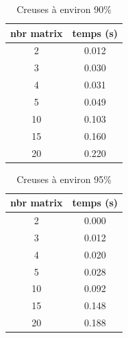 \documentclass[a4paper]{scrartcl}
\begin{document}
\begin{table}[H]
    \caption{Creuses à environ 90\%}
    \label{tab:10}
    \begin{center}
        \begin{tabular}{cc}
             nbr matrix & temps (s)\\
            \hline
            2 &        0.012 \\

    3 &        0.030 \\

    4 &        0.031 \\

    5 &        0.049 \\

    10 &        0.103\\

    15 &        0.160 \\

    20 &        0.220 \\

        \end{tabular}
    \end{center}
\end{table}
\begin{table}[H]
    \caption{Creuses à environ 95\%}
    \label{tab:}
    \begin{center}
        \begin{tabular}{cc}
              nbr matrix & temps (s)\\
            \hline
            2 &        0.000\\

    3 &        0.012\\

    4 &        0.020\\

    5 &        0.028\\

    10 &        0.092\\

    15 &        0.148\\

    20 &        0.188\\

        \end{tabular}
    \end{center}
\end{table}
\end{document}
